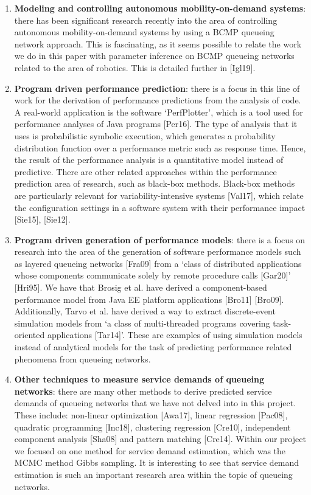 \documentclass[a4paper,11pt,titlepage]{article}
\begin{document}
\begin{enumerate}
    \item \textbf{Modeling and controlling autonomous mobility-on-demand systems}: there has been significant research recently into the area of controlling autonomous mobility-on-demand systems by using a BCMP queueing network approach. This is fascinating, as it seems possible to relate the work we do in this paper with parameter inference on BCMP queueing networks related to the area of robotics. This is detailed further in [Igl19]. 
    \item \textbf{Program driven performance prediction}: there is a focus in this line of work for the derivation of performance predictions from the analysis of code. A real-world application is the software `PerfPlotter', which is a tool used for performance analyses of Java programs [Per16]. The type of analysis that it uses is probabilistic symbolic execution, which generates a probability distribution function over a performance metric such as response time. Hence, the result of the performance analysis is a quantitative model instead of predictive. There are other related approaches within the performance prediction area of research, such as black-box methods. Black-box methods are particularly relevant for variability-intensive systems [Val17], which relate the configuration settings in a software system with their performance impact [Sie15], [Sie12]. 
    \item \textbf{Program driven generation of performance models}: there is a focus on research into the area of the generation of software performance models such as layered queueing networks [Fra09] from a `class of distributed applications whose components communicate solely by remote procedure calls [Gar20]' [Hri95]. We have that Brosig et al. have derived a component-based performance model from Java EE platform applications [Bro11] [Bro09]. Additionally, Tarvo et al. have derived a way to extract discrete-event simulation models from `a class of multi-threaded programs covering task-oriented applications [Tar14]'. These are examples of using simulation models instead of analytical models for the task of predicting performance related phenomena from queueing networks.
    \item \textbf{Other techniques to measure service demands of queueing networks}: there are many other methods to derive predicted service demands of queueing networks that we have not delved into in this project. These include: non-linear optimization [Awa17], linear regression [Pac08], quadratic programming [Inc18], clustering regression [Cre10], independent component analysis [Sha08] and pattern matching [Cre14]. Within our project we focused on one method for service demand estimation, which was the MCMC method Gibbs sampling. It is interesting to see that service demand estimation is such an important research area within the topic of queueing networks. 

\end{enumerate}
\end{document}
